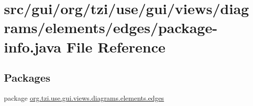 \hypertarget{edges_2package-info_8java}{\section{src/gui/org/tzi/use/gui/views/diagrams/elements/edges/package-\/info.java File Reference}
\label{edges_2package-info_8java}
}
\subsection*{Packages}
\begin{DoxyCompactItemize}
\item 
package \hyperlink{namespaceorg_1_1tzi_1_1use_1_1gui_1_1views_1_1diagrams_1_1elements_1_1edges}{org.\-tzi.\-use.\-gui.\-views.\-diagrams.\-elements.\-edges}
\end{DoxyCompactItemize}
